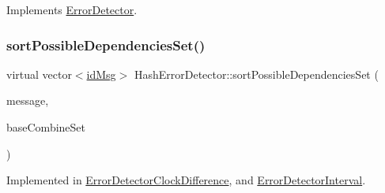 Implements \hyperlink{class_error_detector_a8cac1f6ac6803da4379df7891789c490}{Error\+Detector}.

\mbox{\label{class_hash_error_detector_aa7952b99e47ca7cef6dae2a271885599}} 
\subsubsection{\texorpdfstring{sort\+Possible\+Dependencies\+Set()}{sortPossibleDependenciesSet()}}
{\footnotesize\ttfamily virtual vector$<$\hyperlink{structures_8h_a83a1d9a070efa5341da84cfd8e28d3e5}{id\+Msg}$>$ Hash\+Error\+Detector\+::sort\+Possible\+Dependencies\+Set (\begin{DoxyParamCaption}\item[{const \hyperlink{structures_8h_a7e7bdc1d2fff8a9436f2f352b2711ed6}{message\+Info} \&}]{message,  }\item[{const vector$<$ \hyperlink{structures_8h_a7e7bdc1d2fff8a9436f2f352b2711ed6}{message\+Info} $>$ \&}]{base\+Combine\+Set }\end{DoxyParamCaption})\hspace{0.3cm}{\ttfamily [pure virtual]}}



Implemented in \hyperlink{class_error_detector_clock_difference_a6dafc330591db83f5c5fbee56b2c4937}{Error\+Detector\+Clock\+Difference}, and \hyperlink{class_error_detector_interval_ae74b39e397894e3485c2f7869fca8fb0}{Error\+Detector\+Interval}.

\mbox{\label{class_hash_error_detector_a1c7fe649a34cf7e139ce53a248dce748}} 
